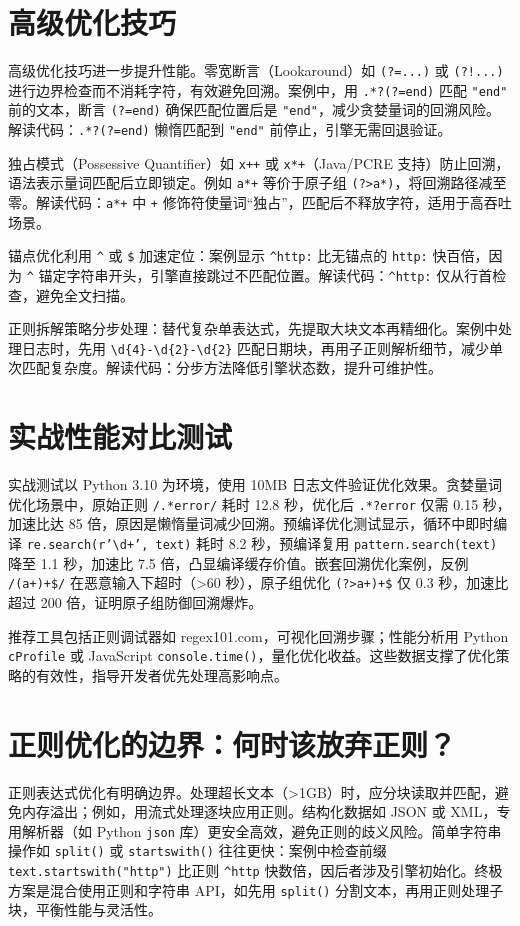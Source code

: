 \chapter{高级优化技巧}
高级优化技巧进一步提升性能。零宽断言（Lookaround）如 \texttt{(?=...)} 或 \texttt{(?!...)} 进行边界检查而不消耗字符，有效避免回溯。案例中，用 \texttt{.*?(?=end)} 匹配 \texttt{"end"} 前的文本，断言 \texttt{(?=end)} 确保匹配位置后是 \texttt{"end"}，减少贪婪量词的回溯风险。解读代码：\texttt{.*?(?=end)} 懒惰匹配到 \texttt{"end"} 前停止，引擎无需回退验证。\par
独占模式（Possessive Quantifier）如 \texttt{x++} 或 \texttt{x*+}（Java/PCRE 支持）防止回溯，语法表示量词匹配后立即锁定。例如 \texttt{a*+} 等价于原子组 \texttt{(?>a*)}，将回溯路径减至零。解读代码：\texttt{a*+} 中 \texttt{+} 修饰符使量词“独占”，匹配后不释放字符，适用于高吞吐场景。\par
锚点优化利用 \texttt{\^{}} 或 \texttt{\${}} 加速定位：案例显示 \texttt{\^{}http:} 比无锚点的 \texttt{http:} 快百倍，因为 \texttt{\^{}} 锚定字符串开头，引擎直接跳过不匹配位置。解读代码：\texttt{\^{}http:} 仅从行首检查，避免全文扫描。\par
正则拆解策略分步处理：替代复杂单表达式，先提取大块文本再精细化。案例中处理日志时，先用 \texttt{\textbackslash{}d\{{}4\}{}-\textbackslash{}d\{{}2\}{}-\textbackslash{}d\{{}2\}{}} 匹配日期块，再用子正则解析细节，减少单次匹配复杂度。解读代码：分步方法降低引擎状态数，提升可维护性。\par
\chapter{实战性能对比测试}
实战测试以 Python 3.10 为环境，使用 10MB 日志文件验证优化效果。贪婪量词优化场景中，原始正则 \texttt{/.*error/} 耗时 12.8 秒，优化后 \texttt{.*?error} 仅需 0.15 秒，加速比达 85 倍，原因是懒惰量词减少回溯。预编译优化测试显示，循环中即时编译 \texttt{re.search(r'\textbackslash{}d+', text)} 耗时 8.2 秒，预编译复用 \texttt{pattern.search(text)} 降至 1.1 秒，加速比 7.5 倍，凸显编译缓存价值。嵌套回溯优化案例，反例 \texttt{/(a+)+\${}/} 在恶意输入下超时（>60 秒），原子组优化 \texttt{(?>a+)+\${}} 仅 0.3 秒，加速比超过 200 倍，证明原子组防御回溯爆炸。\par
推荐工具包括正则调试器如 regex101.com，可视化回溯步骤；性能分析用 Python \texttt{cProfile} 或 JavaScript \texttt{console.time()}，量化优化收益。这些数据支撑了优化策略的有效性，指导开发者优先处理高影响点。\par
\chapter{正则优化的边界：何时该放弃正则？}
正则表达式优化有明确边界。处理超长文本（>1GB）时，应分块读取并匹配，避免内存溢出；例如，用流式处理逐块应用正则。结构化数据如 JSON 或 XML，专用解析器（如 Python \texttt{json} 库）更安全高效，避免正则的歧义风险。简单字符串操作如 \texttt{split()} 或 \texttt{startswith()} 往往更快：案例中检查前缀 \texttt{text.startswith("http")} 比正则 \texttt{\^{}http} 快数倍，因后者涉及引擎初始化。终极方案是混合使用正则和字符串 API，如先用 \texttt{split()} 分割文本，再用正则处理子块，平衡性能与灵活性。\par
